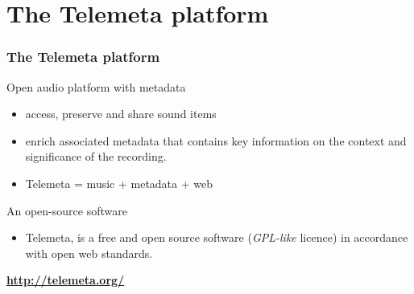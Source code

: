 \documentclass[final, hyperref, table]{beamer}
\begin{document}
\begin{frame}
\end{frame}



\section[Telemeta]{The Telemeta platform}\label{sec:Telemeta}

\begin{frame}
  \frametitle{The Telemeta platform}
  \begin{block}{Open audio platform with metadata}
      \begin{itemize}
      \item \alert{access, preserve} and \alert{share} sound items
      \item enrich associated \alert{metadata} that
        contains key information on the context and significance of
        the recording.
      \item Telemeta = music + metadata + web
      \end{itemize}
    
  \end{block}
  \begin{block}{An open-source software}
    \begin{itemize}
    \item Telemeta, is a \alert{free and open source software} (\emph{GPL-like} licence)
       in accordance with \alert{open web standards}.
    \end{itemize}
    \vspace{-0.5cm}
    \begin{center}
\hspace{1cm}
      \colorbox{yellow!40}{\textbf{\url{http://telemeta.org/}}}
    \end{center}
  \end{block}
\end{frame}
\end{document}
